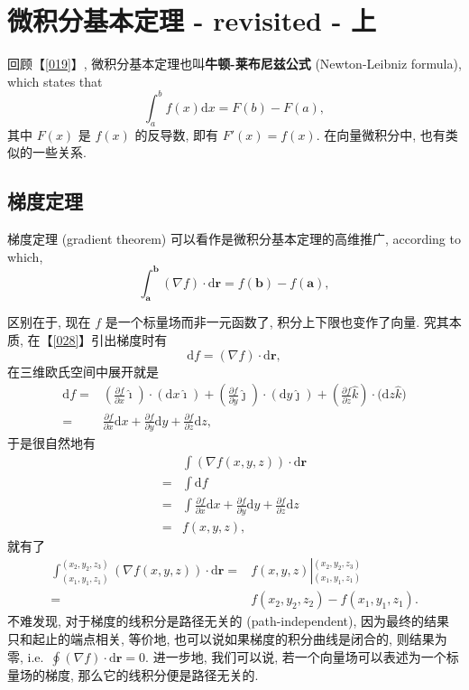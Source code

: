 \section{微积分基本定理 - revisited - 上}\label{031}

回顾【\ref{019}】, 微积分基本定理也叫\textbf{牛顿-莱布尼兹公式}
(Newton-Leibniz formula), which states that \[
\int_a^bf(x)\mathrm{d}x=F(b)-F(a),
\] 其中 $F(x)$ 是 $f(x)$ 的反导数, 即有 $F'(x)=f(x)$.
在向量微积分中, 也有类似的一些关系.

\subsection{梯度定理}

梯度定理 (gradient theorem) 可以看作是微积分基本定理的高维推广,
according to which,
\begin{equation*}
    \boxed{\int_{\boldsymbol{a}}^{\boldsymbol{b}}(\nabla f)\cdot\mathrm{d}\boldsymbol{r}=f(\boldsymbol{b})-f(\boldsymbol{a})},
\end{equation*}

区别在于, 现在 $f$ 是一个标量场而非一元函数了, 积分上下限也变作了向量.
究其本质, 在【\ref{028}】引出梯度时有 \[
\mathrm{d}f=(\nabla f)\cdot\mathrm{d}\boldsymbol{r},
\] 在三维欧氏空间中展开就是 \[
\begin{aligned}
\mathrm{d}f=&\left(\frac{\partial f}{\partial x}\hat{\imath}\right)\cdot\left(\mathrm{d}x\hat{\imath}\right)+\left(\frac{\partial f}{\partial y}\hat{\jmath}\right)\cdot\left(\mathrm{d}y\hat{\jmath}\right)+\left(\frac{\partial f}{\partial z}\hat{k}\right)\cdot\big(\mathrm{d}z\hat{k}\big)\\
=&\frac{\partial f}{\partial x}\mathrm{d}x+\frac{\partial f}{\partial y}\mathrm{d}y+\frac{\partial f}{\partial z}\mathrm{d}z,
\end{aligned}
\] 于是很自然地有 \[
\begin{aligned}
&\int(\nabla f(x,y,z))\cdot\mathrm{d}\boldsymbol{r}\\
=&\int\mathrm{d}f\\
=&\int\frac{\partial f}{\partial x}\mathrm{d}x+\frac{\partial f}{\partial y}\mathrm{d}y+\frac{\partial f}{\partial z}\mathrm{d}z\\
=&f(x,y,z),
\end{aligned}
\] 就有了 \[
\begin{aligned}
\int_{(x_1,y_1,z_1)}^{(x_2,y_2,z_3)}(\nabla f(x,y,z))\cdot\mathrm{d}\boldsymbol{r}=&f(x,y,z)\left|_{(x_1,y_1,z_1)}^{(x_2,y_2,z_3)}\right.\\
=&f(x_2,y_2,z_2)-f(x_1,y_1,z_1).
\end{aligned}
\] 不难发现, 对于梯度的线积分是路径无关的 (path-independent),
因为最终的结果只和起止的端点相关, 等价地,
也可以说如果梯度的积分曲线是闭合的, 则结果为零,
i.e.~$\oint(\nabla f)\cdot\mathrm{d}\boldsymbol{r}=0$. 进一步地,
我们可以说, 若一个向量场可以表述为一个标量场的梯度,
那么它的线积分便是路径无关的.

